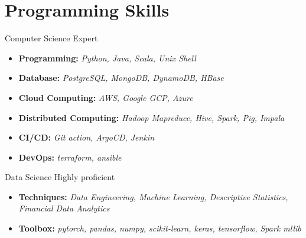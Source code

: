 \section{Programming Skills}\label{sec:programming-skills}

\resumeSubHeadingListStart
\resumeSubheading
{Computer Science}{}
{Expert}{}
\begin{itemize}
    \item \textbf{Programming:} \emph{Python, Java, Scala, Unix Shell}
    \item \textbf{Database:} \emph{PostgreSQL, MongoDB, DynamoDB, HBase}
    \item \textbf{Cloud Computing:} \emph{AWS, Google GCP, Azure}
    \item \textbf{Distributed Computing:} \emph{Hadoop Mapreduce, Hive, Spark, Pig, Impala}
    \item \textbf{CI/CD: } \emph{Git action, ArgoCD, Jenkin}
    \item \textbf{DevOps:} \emph{terraform, ansible}
\end{itemize}

\resumeSubheading
{Data Science}{}
{Highly proficient}{}
\begin{itemize}
    \item \textbf{Techniques:} \emph{Data Engineering, Machine Learning, Descriptive Statistics, Financial Data Analytics}
    \item \textbf{Toolbox:} \emph{pytorch, pandas, numpy, scikit-learn, keras, tensorflow, Spark mllib}
\end{itemize}

\resumeSubHeadingListEnd